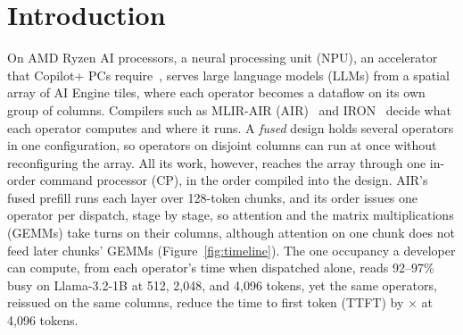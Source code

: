 \section{Introduction}
\label{sec:intro}

On AMD Ryzen\texttrademark{} AI processors, a neural processing unit (NPU), an accelerator that Copilot+ PCs require~\citep{copilotplus-reqs}, serves large language models (LLMs) from a spatial array of AI Engine tiles, where each operator becomes a dataflow on its own group of columns.
Compilers such as MLIR-AIR (AIR)~\citep{wang2026mlirair} and IRON~\citep{hunhoff2025iron} decide what each operator computes and where it runs.
A \emph{fused} design holds several operators in one configuration, so operators on disjoint columns can run at once without reconfiguring the array.
All its work, however, reaches the array through one in-order command processor (CP), in the order compiled into the design.
AIR's fused prefill runs each layer over 128-token chunks, and its order issues one operator per dispatch, stage by stage, so attention and the matrix multiplications (GEMMs) take turns on their columns, although attention on one chunk does not feed later chunks' GEMMs (Figure~\ref{fig:timeline}).
The one occupancy a developer can compute, from each operator's time when dispatched alone, reads 92--97\% busy on Llama-3.2-1B at 512, 2{,}048, and 4{,}096 tokens, yet the same operators, reissued on the same columns, reduce the time to first token (TTFT) by \FigOneGain$\times$ at 4{,}096 tokens.

